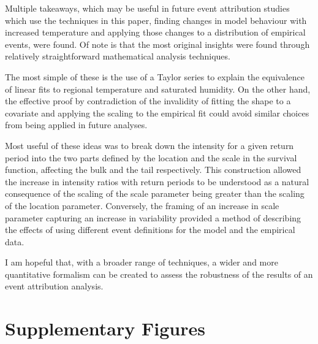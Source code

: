 \documentclass[12pt,a4paper,openany]{report}
\begin{document}
Multiple takeaways,
    which may be useful in future event attribution studies
    which use the techniques in this paper,
    finding changes in model behaviour with increased temperature
    and applying those changes to a distribution of empirical events,
    were found.
Of note is that the most original insights were found through relatively straightforward mathematical analysis techniques.

The most simple of these is the use of a Taylor series to explain
    the equivalence of linear fits to regional temperature and saturated humidity.
On the other hand,
    the effective proof by contradiction of the invalidity of fitting the shape to a covariate and applying the
    scaling to the empirical fit could avoid similar choices from being applied in future analyses.

Most useful of these ideas was to break down the intensity for a given return period
    into the two parts defined by the location and the scale in the survival function,
    affecting the bulk and the tail respectively.
This construction allowed the increase in intensity ratios with return periods to be understood as
    a natural consequence of the scaling of the scale parameter being greater than the
    scaling of the location parameter.
Conversely,
    the framing of an increase in scale parameter capturing an increase in variability
    provided a method of describing the effects of using different event definitions for the model and the empirical data.

I am hopeful that,
    with a broader range of techniques,
    a wider and more quantitative formalism can be created to assess the robustness
    of the results of an event attribution analysis.

\appendix


\chapter{Supplementary Figures}\label{ch:supp}
\end{document}
